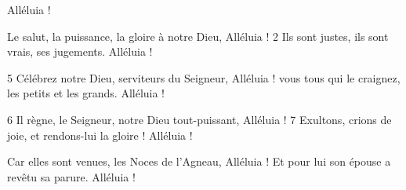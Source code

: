 Alléluia !

Le salut, la puissance,
la gloire à notre Dieu,
Alléluia !
2 Ils sont justes, ils sont vrais,
ses jugements.
Alléluia !

5 Célébrez notre Dieu,
serviteurs du Seigneur,
Alléluia !
vous tous qui le craignez,
les petits et les grands.
Alléluia !

6 Il règne, le Seigneur,
notre Dieu tout-puissant,
Alléluia !
7 Exultons, crions de joie,
et rendons-lui la gloire !
Alléluia !

Car elles sont venues,
les Noces de l'Agneau,
Alléluia !
Et pour lui son épouse
a revêtu sa parure.
Alléluia !